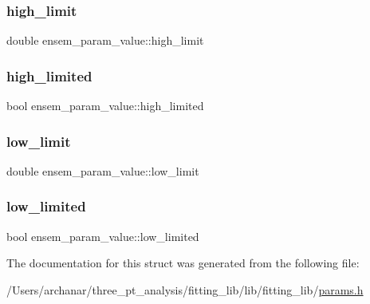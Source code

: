 \subsubsection{\texorpdfstring{high\_limit}{high\_limit}}
{\footnotesize\ttfamily double ensem\+\_\+param\+\_\+value\+::high\+\_\+limit}

\mbox{\label{structensem__param__value_afeca05b1049706d7d7442cf1155c5370}} 
\subsubsection{\texorpdfstring{high\_limited}{high\_limited}}
{\footnotesize\ttfamily bool ensem\+\_\+param\+\_\+value\+::high\+\_\+limited}

\mbox{\label{structensem__param__value_aeefb7c79eb7b747585833d8b40dea889}} 
\subsubsection{\texorpdfstring{low\_limit}{low\_limit}}
{\footnotesize\ttfamily double ensem\+\_\+param\+\_\+value\+::low\+\_\+limit}

\mbox{\label{structensem__param__value_af6f3a535dbfaef2c13add71d75154ca9}} 
\subsubsection{\texorpdfstring{low\_limited}{low\_limited}}
{\footnotesize\ttfamily bool ensem\+\_\+param\+\_\+value\+::low\+\_\+limited}



The documentation for this struct was generated from the following file\+:\begin{DoxyCompactItemize}
\item 
/\+Users/archanar/three\+\_\+pt\+\_\+analysis/fitting\+\_\+lib/lib/fitting\+\_\+lib/\mbox{\hyperlink{lib_2fitting__lib_2params_8h}{params.\+h}}\end{DoxyCompactItemize}
